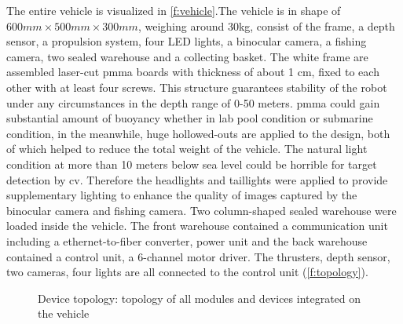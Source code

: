 The entire vehicle is visualized in \autoref{f:vehicle}.The vehicle is in shape
of \ensuremath{600 mm \times 500 mm \times 300 mm}, weighing around 30kg,
consist of the frame, a depth sensor, a propulsion system, four LED lights, a
binocular camera, a fishing camera, two sealed warehouse and a collecting
basket. The white frame are assembled laser-cut \gls{pmma} boards with thickness
of about 1 cm, fixed to each other with at least four screws. This structure
guarantees stability of the robot under any circumstances in the depth range of
0{-}50 meters. \gls{pmma} could gain substantial amount of buoyancy whether in
lab pool condition or submarine condition, in the meanwhile, huge hollowed-outs
are applied to the design, both of which helped to reduce the total weight of
the vehicle. The natural light condition at more than 10 meters below sea level
could be horrible for target detection by \gls{cv}. Therefore the headlights and
taillights were applied to provide supplementary lighting to enhance the quality
of images captured by the binocular camera and fishing camera. Two column-shaped
sealed warehouse were loaded inside the vehicle. The front warehouse contained a
communication unit including a ethernet-to-fiber converter, power unit and the
back warehouse contained a control unit, a 6-channel motor driver. The
thrusters, depth sensor, two cameras, four lights are all connected to the
control unit (\autoref{f:topology}).

\begin{figure}
    \caption[Device topology]{Device topology: topology of all modules and
        devices integrated on the vehicle}\label{f:topology}
\end{figure}

